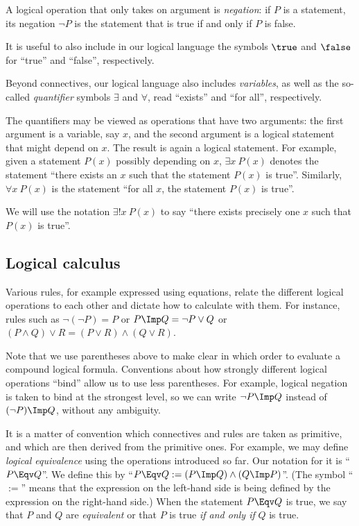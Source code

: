 A logical operation that only takes on argument is \emph{negation}: if $P$ is a statement, its negation $\lnot P$ is the statement that is true if and only if $P$ is false.

It is useful to also include in our logical language the symbols $\true$ and $\false$ for ``true'' and ``false'', respectively.

Beyond connectives, our logical language also includes \emph{variables}, as well as the so-called \emph{quantifier} symbols $\exists$ and $\forall$, read ``exists'' and ``for all'', respectively.

The quantifiers may be viewed as operations that have two arguments: the first argument is a variable, say $x$, and the second argument is a logical statement that might depend on $x$.
The result is again a logical statement.
For example, given a statement $P(x)$ possibly depending on $x$, $\exists x \ P(x)$ denotes the statement ``there exists an $x$ such that the statement $P(x)$ is true''.
Similarly, $\forall x \ P(x)$ is the statement ``for all $x$, the statement $P(x)$ is true''.

We will use the notation $\exists!
    x \ P(x)$ to say ``there exists precisely one $x$ such that $P(x)$ is true''.

\subsection{Logical calculus}

Various rules, for example expressed using equations, relate the different logical operations to each other and dictate how to calculate with them.
For instance, rules such as $\lnot (\lnot P) = P$ or $P \Imp Q = \lnot P \vee Q$ or $(P \wedge Q) \vee R = (P \vee R) \wedge (Q \vee R)$.


Note that we use parentheses above to make clear in which order to evaluate a compound logical formula.
Conventions about how strongly different logical operations ``bind'' allow us to use less parentheses.
For example, logical negation is taken to bind at the strongest level, so we can write $\lnot P \Imp Q$ instead of $(\lnot P) \Imp Q$, without any ambiguity.

It is a matter of convention which connectives and rules are taken as primitive, and which are then derived from the primitive ones.
For example, we may define \emph{logical equivalence} using the operations introduced so far.
Our notation for it is ``$P \Eqv Q$''.
We define this by ``$P \Eqv Q := (P \Imp Q) \wedge (Q \Imp P)$''.
(The symbol ``$:=$'' means that the expression on the left-hand side is being defined by the expression on the right-hand side.) When the statement $P \Eqv Q$ is true, we say that $P$ and $Q$ are \emph{equivalent} or that $P$ is true \emph{if and only if} $Q$ is true.

